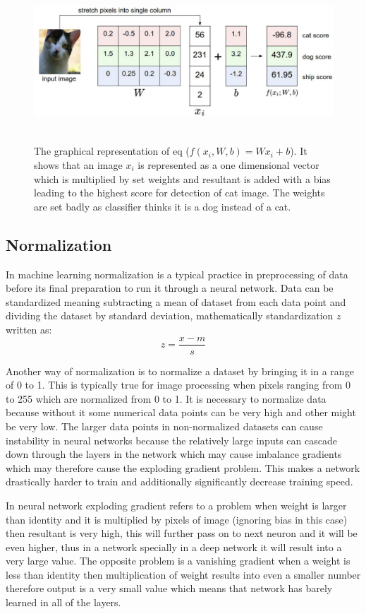 \documentclass[11pt]{article}
\begin{document}
\begin{figure}[H]
	\includegraphics[width=145mm,height=60mm,  scale=0.8]{files/cnn_architecture/linear_class.png}
	\caption{The graphical representation of eq 
		($f(x_i, W, b) = Wx_i + b$). It shows that an image $x_i$ is represented as a one dimensional vector which is multiplied by set weights and resultant is added with a bias leading to the highest score for detection of cat image. The weights are set badly as classifier thinks it is a dog instead of a cat.}
	\label{fig: linear classifier}
\end{figure}

\subsection{Normalization}
In machine learning normalization is a typical practice in preprocessing of data before its final preparation to run it through a neural network. Data can be standardized meaning subtracting a mean of dataset from each data point and dividing the dataset by standard deviation, mathematically standardization $z$ written as:
$$ z = \dfrac{x-m}{s}$$

Another way of normalization is to normalize a dataset by bringing it in a range of 0 to 1. This is typically true for image processing when pixels ranging from 0 to 255 which are normalized from 0 to 1. It is necessary to normalize data because without it some numerical data points can be very high and other might be very low. The larger data points in non-normalized datasets can cause instability in neural networks because the relatively large inputs can cascade down through the layers in the network which may cause imbalance gradients which may therefore cause the exploding gradient problem. This makes a network drastically harder to train and additionally significantly decrease training speed.

In neural network exploding gradient refers to a problem when weight is larger than identity and it is multiplied by pixels of image (ignoring bias in this case) then resultant is very high, this will further pass on to next neuron and it will be even higher, thus in a network specially in a deep network it will result into a very large value. The opposite problem is a vanishing gradient when a weight is less than identity then multiplication of weight results into even a smaller number therefore output is a very small value which means that network has barely learned in all of the layers.
\end{document}
